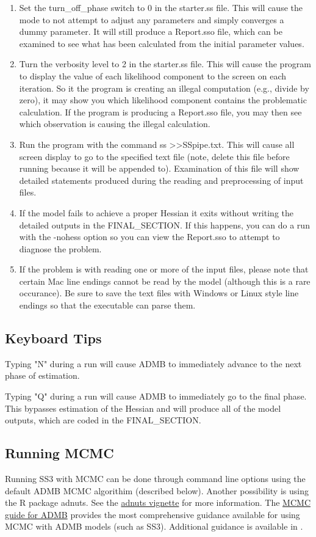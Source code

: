\begin{enumerate}
	\item Set the turn\_off\_phase switch to 0 in the starter.ss file.  This will cause the mode to not attempt to adjust any parameters and simply converges a dummy parameter.  It will still produce a Report.sso file, which can be examined to see what has been calculated from the initial parameter values.
	\item Turn the verbosity level to 2 in the starter.ss file.  This will cause the program to display the value of each likelihood component to the screen on each iteration.  So it the program is creating an illegal computation (e.g., divide by zero), it may show you which likelihood component contains the problematic calculation.  If the program is producing a Report.sso file, you may then see which observation is causing the illegal calculation.
	\item Run the program with the command ss >>SSpipe.txt.  This will cause all screen display to go to the specified text file (note, delete this file before running because it will be appended to).  Examination of this file will show detailed statements produced during the reading and preprocessing of input files.
	\item If the model fails to achieve a proper Hessian it exits without writing the detailed outputs in the FINAL\_SECTION.  If this happens, you can do a run with the -nohess option so you can view the Report.sso to attempt to diagnose the problem.
	\item If the problem is with reading one or more of the input files, please note that certain Mac line endings cannot be read by the model (although this is a rare occurance). Be sure to save the text files with Windows or Linux style line endings so that the executable can parse them.
\end{enumerate}

\subsection{Keyboard Tips}
Typing "N" during a run will cause ADMB to immediately advance to the next phase of estimation.

Typing "Q"  during a run will cause ADMB to immediately go to the final phase.  This bypasses estimation of the Hessian and will produce all of the model outputs, which are coded in the FINAL\_SECTION.

\subsection{Running MCMC}
 Running SS3 with MCMC can be done through command line options using the default ADMB MCMC algorithim (described below). Another possibility is using the R package adnuts. See the \href{https://cran.r-project.org/web/packages/adnuts/vignettes/adnuts.html}{adnuts vignette} for more information. The \href{https://www.admb-project.org/developers/mcmc/mcmc-guide-for-admb.pdf}{MCMC guide for ADMB} provides the most comprehensive guidance available for using MCMC with ADMB models (such as SS3). Additional guidance is available in \citep{monnahan2019overcoming}.

